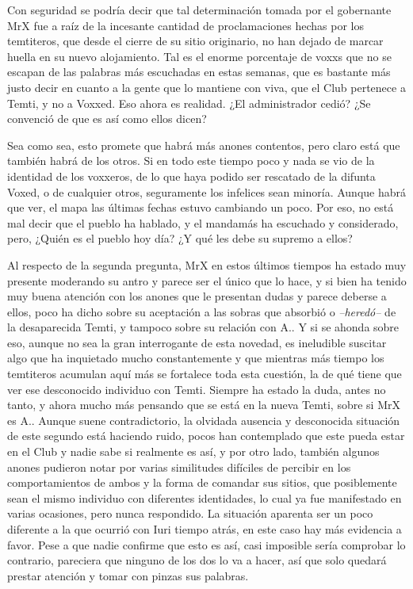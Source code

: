 \documentclass[
  spanish,
]{book}
\begin{document}
Con seguridad se podría decir que tal determinación tomada por el gobernante MrX fue a raíz de la incesante cantidad de proclamaciones hechas por los temtiteros, que desde el cierre de su sitio originario, no han dejado de marcar huella en su nuevo alojamiento. Tal es el enorme porcentaje de voxxs que no se escapan de las palabras más escuchadas en estas semanas, que es bastante más justo decir en cuanto a la gente que lo mantiene con viva, que el Club pertenece a Temti, y no a Voxxed. Eso ahora es realidad.
¿El administrador cedió? ¿Se convenció de que es así como ellos dicen?

Sea como sea, esto promete que habrá más anones contentos, pero claro está que también habrá de los otros. Si en todo este tiempo poco y nada se vio de la identidad de los voxxeros, de lo que haya podido ser rescatado de la difunta Voxed, o de cualquier otros, seguramente los infelices sean minoría. Aunque habrá que ver, el mapa las últimas fechas estuvo cambiando un poco. Por eso, no está mal decir que el pueblo ha hablado, y el mandamás ha escuchado y considerado, pero, ¿Quién es el pueblo hoy día? ¿Y qué les debe su supremo a ellos?

Al respecto de la segunda pregunta, MrX en estos últimos tiempos ha estado muy presente moderando su antro y parece ser el único que lo hace, y si bien ha tenido muy buena atención con los anones que le presentan dudas y parece deberse a ellos, poco ha dicho sobre su aceptación a las sobras que absorbió o \emph{--heredó--} de la desaparecida Temti, y tampoco sobre su relación con A..
Y si se ahonda sobre eso, aunque no sea la gran interrogante de esta novedad, es ineludible suscitar algo que ha inquietado mucho constantemente y que mientras más tiempo los temtiteros acumulan aquí más se fortalece toda esta cuestión, la de qué tiene que ver ese desconocido individuo con Temti.
Siempre ha estado la duda, antes no tanto, y ahora mucho más pensando que se está en la nueva Temti, sobre si MrX es A.. Aunque suene contradictorio, la olvidada ausencia y desconocida situación de este segundo está haciendo ruido, pocos han contemplado que este pueda estar en el Club y nadie sabe si realmente es así, y por otro lado, también algunos anones pudieron notar por varias similitudes difíciles de percibir en los comportamientos de ambos y la forma de comandar sus sitios, que posiblemente sean el mismo individuo con diferentes identidades, lo cual ya fue manifestado en varias ocasiones, pero nunca respondido. La situación aparenta ser un poco diferente a la que ocurrió con Iuri tiempo atrás, en este caso hay más evidencia a favor. Pese a que nadie confirme que esto es así, casi imposible sería comprobar lo contrario, pareciera que ninguno de los dos lo va a hacer, así que solo quedará prestar atención y tomar con pinzas sus palabras.
\end{document}
